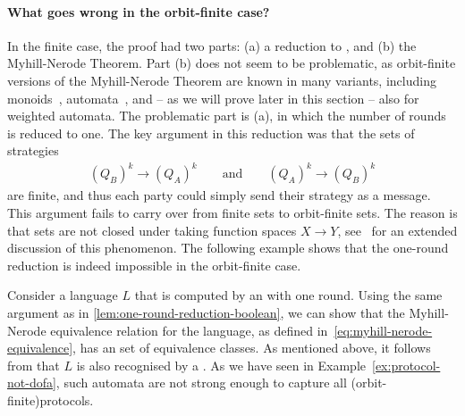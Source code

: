 \paragraph*{What goes wrong in the orbit-finite case?}
In the finite case, the proof had two parts: (a) a reduction to , and (b) the Myhill-Nerode Theorem.
Part (b) does not seem to be problematic, as orbit-finite versions of the Myhill-Nerode Theorem are known in many variants, 
including monoids~\cite[Lemma 3.3]{bojanczykNominalMonoids2013}, automata~\cite[Section 3.2]{bojanczykAutomataTheoryNominal2014}, 
and -- as we will prove later in this section -- also for weighted automata. 
The problematic part is (a), in which the number of rounds is reduced to one.
The key argument in this reduction  was that the sets of strategies 
  \begin{align*}
    (Q_B)^k \to (Q_A)^k \qquad \text{and} \qquad (Q_A)^k \to (Q_B)^k
    \end{align*}
are finite, and thus each party could simply send their strategy as a message.
This argument fails to carry over from finite sets to orbit-finite sets. 
The reason is that  sets are not closed under taking function spaces $X \to Y$, see~\cite{functionSpaces2024} 
for an extended discussion of this phenomenon.
The following example shows that the one-round reduction 
is indeed impossible in the orbit-finite case.

\begin{myexample}
    \label{ex:no-one-round-reduction}
    Consider a language $L$ that is computed by an  with
    one round. Using the same argument as in
    \cref{lem:one-round-reduction-boolean}, we can show that the Myhill-Nerode
    equivalence relation for the language, as defined
    in~\eqref{eq:myhill-nerode-equivalence}, has an  set of
    equivalence classes. As mentioned above, it follows from \cite[Section
    3.2]{bojanczykAutomataTheoryNominal2014} that $L$ is also recognised by a
    . As we have seen in
    Example~\ref{ex:protocol-not-dofa}, such automata are not strong enough to
    capture all \kl(orbit-finite){protocols}.
\end{myexample}

